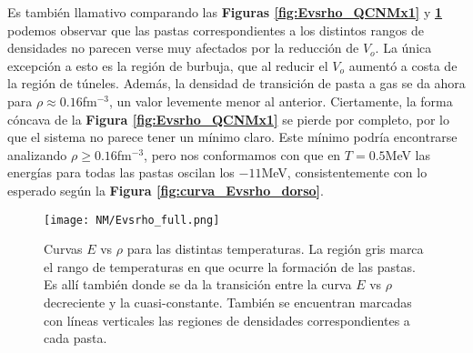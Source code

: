 Es también llamativo comparando las \textbf{Figuras \ref{fig:Evsrho_QCNMx1}} y \textbf{\ref{fig:Evsrho_QCNMx0,5}} podemos observar que las pastas correspondientes a los distintos rangos de densidades
no parecen verse muy afectados por la reducción de $V_o$. 
La única excepción a esto es la región de burbuja, que al reducir el $V_o$ aumentó a costa de la región de túneles. 
Además, la densidad de transición de pasta a gas se da ahora para $\rho \approx 0.16$fm$^{-3}$, un valor levemente menor al anterior. 
Ciertamente, la forma cóncava de la \textbf{Figura \ref{fig:Evsrho_QCNMx1}} se pierde por completo, por lo que el sistema no parece tener un mínimo claro.
Este mínimo podría encontrarse analizando $\rho\geq 0.16$fm$^{-3}$, pero nos conformamos con que en $T=0.5$MeV las energías para todas las pastas oscilan los $-11$MeV, consistentemente con lo esperado según la \textbf{Figura \ref{fig:curva_Evsrho_dorso}}.

\begin{figure}[H]
	\centering
	\texttt{[image: NM/Evsrho\_full.png]}
	\caption{Curvas $E$ vs $\rho$ para las distintas temperaturas. 
	La región gris marca el rango de temperaturas en que ocurre la formación de las pastas.
	Es allí también donde se da la transición entre la curva $E$ vs $\rho$ decreciente y la cuasi-constante.
	También se encuentran marcadas con líneas verticales las regiones de densidades correspondientes a cada pasta.}
	\label{fig:Evsrho_QCNMx0,5}
\end{figure}
